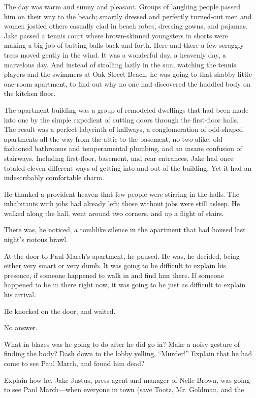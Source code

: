 \documentclass{novel}
\begin{document}
The day was warm and sunny and pleasant. Groups of laughing people passed him on their way to the beach; smartly dressed and perfectly turned-out men and women jostled others casually clad in beach robes, dressing gowns, and pajamas. Jake passed a tennis court where brown-skinned youngsters in shorts were making a big job of batting balls back and forth. Here and there a few scraggly trees moved gently in the wind. It was a wonderful day, a heavenly day, a marvelous day. And instead of strolling lazily in the sun, watching the tennis players and the swimmers at Oak Street Beach, he was going to that shabby little one-room apartment, to find out why no one had discovered the huddled body on the kitchen floor.

The apartment building was a group of remodeled dwellings that had been made into one by the simple expedient of cutting doors through the first-floor halls. The result was a perfect labyrinth of hallways, a conglomeration of odd-shaped apartments all the way from the attic to the basement, no two alike, old-fashioned bathrooms and temperamental plumbing, and an insane confusion of stairways. Including first-floor, basement, and rear entrances, Jake had once totaled eleven different ways of getting into and out of the building. Yet it had an indescribably comfortable charm.

He thanked a provident heaven that few people were stirring in the halls. The inhabitants with jobs had already left; those without jobs were still asleep. He walked along the hall, went around two corners, and up a flight of stairs.

There was, he noticed, a tomblike silence in the apartment that had housed last night’s riotous brawl.

At the door to Paul March’s apartment, he paused. He was, he decided, being either very smart or very dumb. It was going to be difficult to explain his presence, if someone happened to walk in and find him there. If someone happened to be in there right now, it was going to be just as difficult to explain his arrival.

He knocked on the door, and waited.

No answer.

What in blazes was he going to do after he did go in? Make a noisy gesture of finding the body? Dash down to the lobby yelling, “Murder!” Explain that he had come to see Paul March, and found him dead?

Explain how he, Jake Justus, press agent and manager of Nelle Brown, was going to see Paul March—when everyone in town (save Tootz, Mr. Goldman, and the
\end{document}
